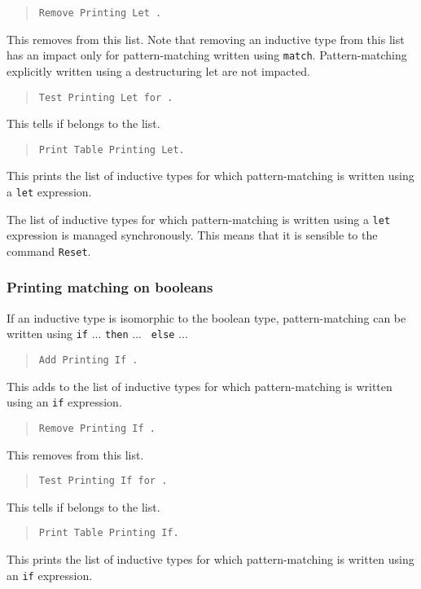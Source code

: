 \begin{quote}
{\tt Remove Printing Let {\ident}.}
\end{quote}
This removes {\ident} from this list. Note that removing an inductive
type from this list has an impact only for pattern-matching written using
\texttt{match}. Pattern-matching explicitly written using a destructuring
let are not impacted.

\begin{quote}
{\tt Test Printing Let for {\ident}.}
\end{quote}
This tells if {\ident} belongs to the list.

\begin{quote}
{\tt Print Table Printing Let.}
\end{quote}
This prints the list of inductive types for which pattern-matching is
written using a {\tt let} expression.

The list of inductive types for which pattern-matching is written
using a {\tt let} expression is managed synchronously. This means that
it is sensible to the command {\tt Reset}.

\subsubsection{Printing matching on booleans
}

If an inductive type is isomorphic to the boolean type,
pattern-matching can be written using {\tt if} ... {\tt then} ... {\tt
  else} ...

\begin{quote}
{\tt Add Printing If {\ident}.}
\end{quote}
This adds {\ident} to the list of inductive types for which
pattern-matching is written using an {\tt if} expression.

\begin{quote}
{\tt Remove Printing If {\ident}.}
\end{quote}
This removes {\ident} from this list.

\begin{quote}
{\tt Test Printing If for {\ident}.}
\end{quote}
This tells if {\ident} belongs to the list.

\begin{quote}
{\tt Print Table Printing If.}
\end{quote}
This prints the list of inductive types for which pattern-matching is
written using an {\tt if} expression.

